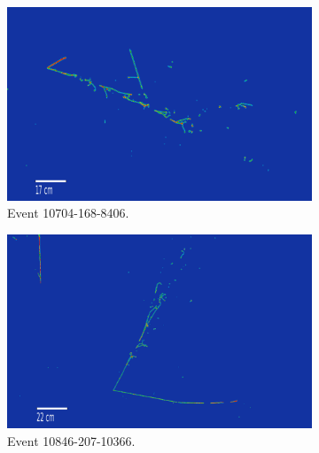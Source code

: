 \begin{figure}[H]
    \begin{center}
    \begin{subfigure}{0.45\textwidth}
    \includegraphics[width=1.00\textwidth]{Sidebands/Figures/1eNp/HighEnergy/EVD/raw/10704_168_8406_Y_raw.png}
    \caption{Event 10704-168-8406.}
    \end{subfigure}
    \begin{subfigure}{0.45\textwidth}
    \includegraphics[width=1.00\textwidth]{Sidebands/Figures/1eNp/HighEnergy/EVD/raw/10846_207_10366_Y_raw.png}
    \caption{Event 10846-207-10366.}
    \end{subfigure} \\
    \vspace{0.3cm}
    \begin{subfigure}{0.45\textwidth}

\end{subfigure}
\end{center}
\end{figure}
